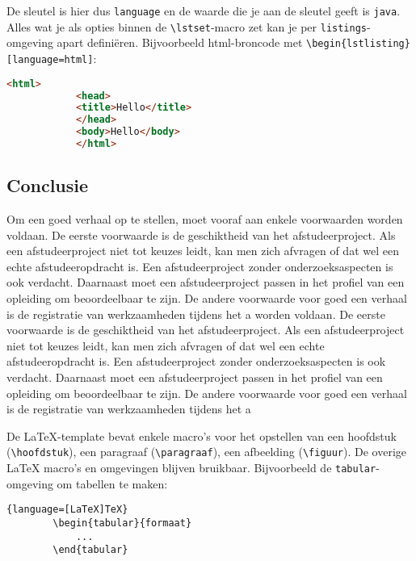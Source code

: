 De sleutel is hier dus \verb!language! en de waarde die je aan de
sleutel geeft is \verb!java!. Alles wat je als opties binnen de
\verb!\lstset!-macro zet kan je per \verb!listings!-omgeving apart
definiëren. Bijvoorbeeld html-broncode met
\verb!\begin{lstlisting}[language=html]!:
	
	\begin{Aanpassen}
		\begin{lstlisting}[language=html]
			<html>
			<head>
			<title>Hello</title>
			</head>
			<body>Hello</body>
			</html>
		\end{lstlisting}
	\end{Aanpassen}
	
	
	\subsection{Conclusie}
	
	
	
	Om een goed verhaal op te stellen, moet vooraf aan enkele voorwaarden
	worden voldaan. De eerste voorwaarde is de geschiktheid van het
	afstudeerproject. Als een afstudeerproject niet tot keuzes leidt, kan
	men zich afvragen of dat wel een echte afstudeeropdracht is. Een
	afstudeerproject zonder onderzoeksaspecten is ook verdacht. Daarnaast
	moet een afstudeerproject passen in het profiel van een opleiding om
	beoordeelbaar te zijn. De andere voorwaarde voor goed een verhaal is
	de registratie van werkzaamheden tijdens het a
	worden voldaan. De eerste voorwaarde is de geschiktheid van het
	afstudeerproject. Als een afstudeerproject niet tot keuzes leidt, kan
	men zich afvragen of dat wel een echte afstudeeropdracht is. Een
	afstudeerproject zonder onderzoeksaspecten is ook verdacht. Daarnaast
	moet een afstudeerproject passen in het profiel van een opleiding om
	beoordeelbaar te zijn. De andere voorwaarde voor goed een verhaal is
	de registratie van werkzaamheden tijdens het a
	
	
	
	De \LaTeX{}-template bevat enkele macro's voor het opstellen van een
	hoofdstuk (\verb!\hoofdstuk!), een paragraaf (\verb!\paragraaf!), een
	afbeelding (\verb!\figuur!). De overige \LaTeX{} macro's en omgevingen
	blijven bruikbaar. Bijvoorbeeld de \verb!tabular!-omgeving om tabellen
	te maken:
	
	\begin{lstlisting}{language=[LaTeX]TeX}
		\begin{tabular}{formaat}
			... 
		\end{tabular}
	\end{lstlisting}
	
